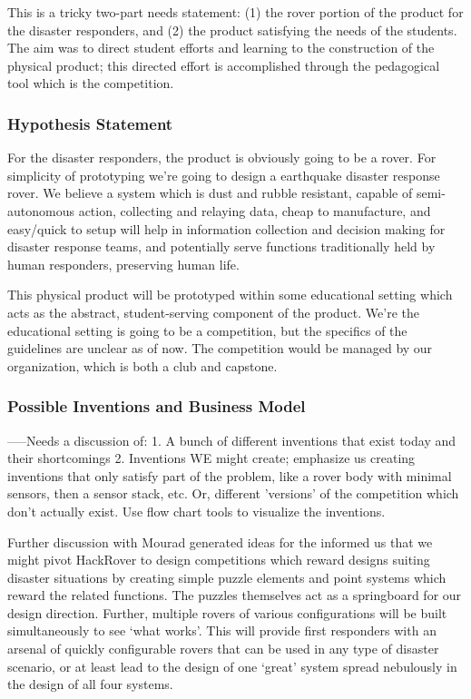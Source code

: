 \documentclass[a4paper, 10pt]{article}
\begin{document}
		This is a tricky two-part needs statement: (1) the rover portion of the product for the disaster responders, and (2) the product satisfying the needs of the students. The aim was to direct student efforts and learning to the construction of the physical product; this directed effort is accomplished through the pedagogical tool which is the competition. 

		\subsubsection{Hypothesis Statement}
		For the disaster responders, the product is obviously going to be a rover. For simplicity of prototyping we're going to design a earthquake disaster response rover. We believe a system which is dust and rubble resistant, capable of semi-autonomous action, collecting and relaying data, cheap to manufacture, and easy/quick to setup will help in information collection and decision making for disaster response teams, and potentially serve functions traditionally held by human responders, preserving human life. 
		
		This physical product will be prototyped within some educational setting which acts as the abstract, student-serving component of the product. We're the educational setting is going to be a competition, but the specifics of the guidelines are unclear as of now. The competition would be managed by our organization, which is both a club and capstone. 

		\subsubsection{Possible Inventions and Business Model}
		-----Needs a discussion of:
		1. A bunch of different inventions that exist today and their shortcomings
		2. Inventions WE might create; emphasize us creating inventions that only satisfy part of the problem, like a rover body with minimal sensors, then a sensor stack, etc. Or, different 'versions' of the competition which don't actually exist. Use flow chart tools to visualize the inventions. 
			
		Further discussion with Mourad generated ideas for the informed us that we might pivot HackRover to design competitions which reward designs suiting disaster situations by creating simple puzzle elements and point systems which reward the related functions. The puzzles themselves act as a springboard for our design direction. Further, multiple rovers of various configurations will be built simultaneously to see ‘what works’. This will provide first responders with an arsenal of quickly configurable rovers that can be used in any type of disaster scenario, or at least lead to the design of one ‘great’ system spread nebulously in the design of all four systems.		
		
\end{document}
